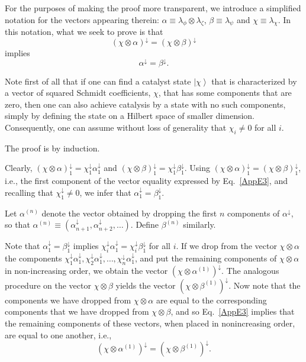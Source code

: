 \documentclass[12pt]{article}
\newcommand{\ket}[1]{\left| #1 \right>}
\theoremstyle{plain}
\theoremstyle{definition}
\begin{document}
\begin{appendices}
For the purposes of making the proof more transparent, we introduce a simplified notation for the vectors appearing therein: $\alpha \equiv \lambda_{\phi} \otimes \lambda_{\zeta}$,  $\beta \equiv \lambda_{\psi}$ and $\chi \equiv \lambda_{\chi}$.  In this notation, what we seek to prove is that  
\begin{equation}\label{AppE3}
(\chi \otimes \alpha)^{\downarrow} = (\chi \otimes \beta)^{\downarrow}
\end{equation}
 implies 
 \begin{equation}\label{AppE4}
 \alpha^{\downarrow} = \beta^{\downarrow}.
 \end{equation}


Note first of all that if one can find a catalyst state $\ket \chi$ that is characterized by a vector of squared Schmidt coefficients, $\chi$, that has some components that are zero, then one can also achieve catalysis by a state with no such components, simply by defining the state on a Hilbert space of smaller dimension. Consequently, one can assume without loss of generality that $\chi_i \ne 0$ for all $i$. 

The proof is by induction.  

Clearly, $(\chi \otimes \alpha)^{\downarrow}_1 = \chi^{\downarrow}_1 \alpha^{\downarrow}_1$ and $(\chi \otimes \beta)^{\downarrow}_1 = \chi^{\downarrow}_1 \beta^{\downarrow}_1$.  Using  $(\chi \otimes \alpha)^{\downarrow}_1 = (\chi \otimes \beta)^{\downarrow}_1$, i.e., the first component of the vector equality expressed by Eq.~\eqref{AppE3}, 
 and recalling that $\chi^{\downarrow}_1 \ne 0$, we infer that $\alpha^{\downarrow}_1 =\beta^{\downarrow}_1$.  
 

Let  $\alpha^{(n)}$ denote the vector obtained by dropping the first $n$ components of $\alpha^{\downarrow}$, so that $\alpha^{(n)} \equiv (\alpha^{\downarrow}_{n+1},\alpha^{\downarrow}_{n+2},\dots)$.  Define $\beta^{(n)}$ similarly.  

Note that $\alpha^{\downarrow}_1 =\beta^{\downarrow}_1$ implies $ \chi^{\downarrow}_i \alpha^{\downarrow}_1 =  \chi^{\downarrow}_i \beta^{\downarrow}_1$ for all $i$.  If we drop from the vector $\chi \otimes \alpha$ the components $\chi^{\downarrow}_1 \alpha^{\downarrow}_1, \chi^{\downarrow}_2 \alpha^{\downarrow}_1, \dots, \chi^{\downarrow}_n \alpha^{\downarrow}_1 $, and put the remaining components of $\chi \otimes \alpha$ in non-increasing order, we obtain the vector $(\chi \otimes \alpha^{(1)})^{\downarrow}$.  The analogous procedure on the vector $\chi \otimes \beta$ yields the vector $(\chi \otimes \beta^{(1)})^{\downarrow}$.  Now note that the components we have dropped from $\chi \otimes \alpha$ are equal to the corresponding components that we have dropped from $\chi \otimes \beta$, and so Eq.~\eqref{AppE3} implies that the remaining components of these vectors, when placed in nonincreasing order, are equal to one another, i.e.,
\begin{equation}\label{AppE6}
(\chi \otimes \alpha^{(1)})^{\downarrow}= (\chi \otimes \beta^{(1)})^{\downarrow}.
\end{equation}


\end{appendices}
\end{document}
